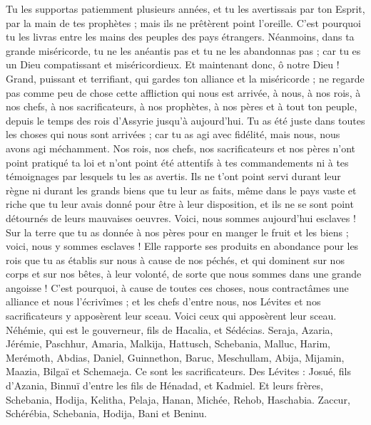 \begin{multicols}{2}
Tu les supportas patiemment plusieurs années, et tu les avertissais par ton Esprit, par la main de tes prophètes ; mais ils ne prêtèrent point l'oreille. C’est pourquoi tu les livras entre les mains des peuples des pays étrangers.
Néanmoins, dans ta grande miséricorde, tu ne les anéantis pas et tu ne les abandonnas pas ; car tu es un Dieu compatissant et miséricordieux.
Et maintenant donc, ô notre Dieu ! Grand, puissant et terrifiant, qui gardes ton alliance et la miséricorde ; ne regarde pas comme peu de chose cette affliction qui nous est arrivée, à nous, à nos rois, à nos chefs, à nos sacrificateurs, à nos prophètes, à nos pères et à tout ton peuple, depuis le temps des rois d'Assyrie jusqu'à aujourd'hui.
Tu as été juste dans toutes les choses qui nous sont arrivées ; car tu as agi avec fidélité, mais nous, nous avons agi méchamment.
Nos rois, nos chefs, nos sacrificateurs et nos pères n'ont point pratiqué ta loi et n'ont point été attentifs à tes commandements ni à tes témoignages par lesquels tu les as avertis.
Ils ne t'ont point servi durant leur règne ni durant les grands biens que tu leur as faits, même dans le pays vaste et riche que tu leur avais donné pour être à leur disposition, et ils ne se sont point détournés de leurs mauvaises oeuvres.
Voici, nous sommes aujourd'hui esclaves ! Sur la terre que tu as donnée à nos pères pour en manger le fruit et les biens ; voici, nous y sommes esclaves !
Elle rapporte ses produits en abondance pour les rois que tu as établis sur nous à cause de nos péchés, et qui dominent sur nos corps et sur nos bêtes, à leur volonté, de sorte que nous sommes dans une grande angoisse !
C'est pourquoi, à cause de toutes ces choses, nous contractâmes une alliance et nous l'écrivîmes ; et les chefs d'entre nous, nos Lévites et nos sacrificateurs y apposèrent leur sceau.
\VerseOne{}Voici ceux qui apposèrent leur sceau. Néhémie, qui est le gouverneur, fils de Hacalia, et Sédécias.
Seraja, Azaria, Jérémie,
Paschhur, Amaria, Malkija,
Hattusch, Schebania, Malluc,
Harim, Merémoth, Abdias,
Daniel, Guinnethon, Baruc,
Meschullam, Abija, Mijamin,
Maazia, Bilgaï et Schemaeja. Ce sont les sacrificateurs.
Des Lévites : Josué, fils d'Azania, Binnuï d'entre les fils de Hénadad, et Kadmiel.
Et leurs frères, Schebania, Hodija, Kelitha, Pelaja, Hanan,
Michée, Rehob, Haschabia.
Zaccur, Schérébia, Schebania,
Hodija, Bani et Beninu.

\end{multicols}
